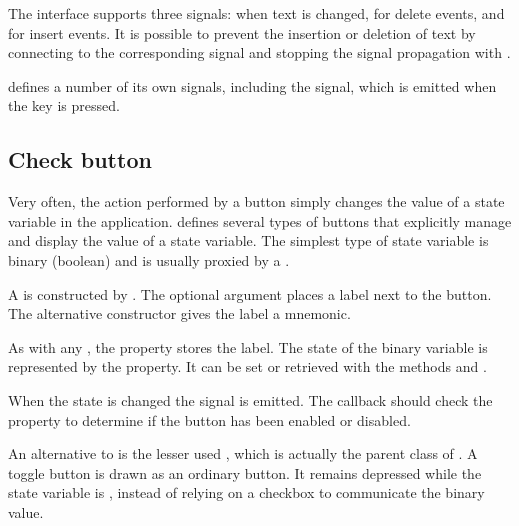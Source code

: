 The  interface supports three signals:
 when text is changed,  for delete
events, and  for insert events. It is possible to
prevent the insertion or deletion of text by connecting to the
corresponding signal and stopping the signal propagation with
. 

 defines a number of its own signals, including the
 signal, which is emitted when the  key is
pressed.



\subsection{Check button}
\label{sec:RGtk2:gtkCheckbox}

Very often, the action performed by a button simply changes the value
of a state variable in the application. \GTK\/ defines several types
of buttons that explicitly manage and display the value of a state
variable. The simplest type of state variable is binary (boolean) and is
usually proxied by a . 

A  is constructed by
. The optional argument
 places a label next to the
button. The alternative constructor
 gives the label a mnemonic.

As with any , the  property stores the
label.  The state of the binary variable is represented by the
 property. It can be set or retrieved with the methods
 and
.

When the state is changed the  signal is emitted. The
callback should check the  property to determine if the
button has been enabled or disabled.

An alternative to  is the lesser used
, which is actually the parent class of
. A toggle button is drawn as an ordinary
button. It remains depressed while the state variable is ,
instead of relying on a checkbox to communicate the binary value.

